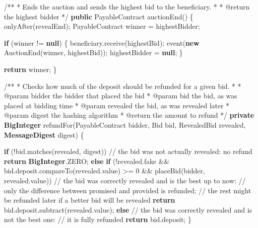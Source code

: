 \documentclass[a4paper,]{book}
\newenvironment{Shaded}{\begin{snugshade}}{\end{snugshade}}
\newcommand{\AnnotationTok}[1]{\textcolor[rgb]{0.79,0.38,0.79}{#1}}
\newcommand{\BuiltInTok}[1]{\textcolor[rgb]{0.39,0.29,0.61}{\textbf{#1}}}
\newcommand{\CommentTok}[1]{\textcolor[rgb]{0.54,0.53,0.53}{#1}}
\newcommand{\DecValTok}[1]{\textcolor[rgb]{0.69,0.50,0.00}{#1}}
\newcommand{\FunctionTok}[1]{\textcolor[rgb]{0.39,0.29,0.61}{#1}}
\newcommand{\KeywordTok}[1]{\textcolor[rgb]{0.12,0.11,0.11}{\textbf{#1}}}
\newcommand{\NormalTok}[1]{\textcolor[rgb]{0.12,0.11,0.11}{#1}}
\renewenvironment{Shaded}{\begin{snugshade}\small}{\end{snugshade}}
\begin{document}
{\begin{Shaded}
\begin{Highlighting}[]
  \CommentTok{/**}
   \CommentTok{*}\NormalTok{ Ends the auction and sends the highest bid to the beneficiary}\CommentTok{.}
   \CommentTok{*} 
   \CommentTok{*} \AnnotationTok{@return }\NormalTok{the highest bidder}
   \CommentTok{*/}
  \KeywordTok{public}\NormalTok{ PayableContract }\FunctionTok{auctionEnd}\NormalTok{() \{}
    \FunctionTok{onlyAfter}\NormalTok{(revealEnd);}
\NormalTok{    PayableContract winner = highestBidder;}
        
    \KeywordTok{if}\NormalTok{ (winner != }\KeywordTok{null}\NormalTok{) \{}
\NormalTok{      beneficiary.}\FunctionTok{receive}\NormalTok{(highestBid);}
      \FunctionTok{event}\NormalTok{(}\KeywordTok{new} \FunctionTok{AuctionEnd}\NormalTok{(winner, highestBid));}
\NormalTok{      highestBidder = }\KeywordTok{null}\NormalTok{;}
\NormalTok{    \}}

    \KeywordTok{return}\NormalTok{ winner;}
\NormalTok{  \}}

  \CommentTok{/**}
   \CommentTok{*}\NormalTok{ Checks how much of the deposit should be refunded for a given bid}\CommentTok{.}
   \CommentTok{*} 
   \CommentTok{*} \AnnotationTok{@param bidder }\NormalTok{the bidder that placed the bid}
   \CommentTok{*} \AnnotationTok{@param bid }\NormalTok{the bid}\CommentTok{,}\NormalTok{ as was placed at bidding time}
   \CommentTok{*} \AnnotationTok{@param revealed }\NormalTok{the bid}\CommentTok{,}\NormalTok{ as was revealed later}
   \CommentTok{*} \AnnotationTok{@param digest }\NormalTok{the hashing algorithm}
   \CommentTok{*} \AnnotationTok{@return }\NormalTok{the amount to refund}
   \CommentTok{*/}
  \KeywordTok{private} \BuiltInTok{BigInteger} \FunctionTok{refundFor}\NormalTok{(PayableContract bidder, Bid bid,}
\NormalTok{      RevealedBid revealed, }\BuiltInTok{MessageDigest}\NormalTok{ digest) \{}

    \KeywordTok{if}\NormalTok{ (!bid.}\FunctionTok{matches}\NormalTok{(revealed, digest))}
      \CommentTok{// the bid was not actually revealed: no refund}
      \KeywordTok{return} \BuiltInTok{BigInteger}\NormalTok{.}\FunctionTok{ZERO}\NormalTok{;}
    \KeywordTok{else} \KeywordTok{if}\NormalTok{ (!revealed.}\FunctionTok{fake}\NormalTok{ && bid.}\FunctionTok{deposit}\NormalTok{.}\FunctionTok{compareTo}\NormalTok{(revealed.}\FunctionTok{value}\NormalTok{) >= }\DecValTok{0}
\NormalTok{        && }\FunctionTok{placeBid}\NormalTok{(bidder, revealed.}\FunctionTok{value}\NormalTok{))}
      \CommentTok{// the bid was correctly revealed and is the best up to now:}
      \CommentTok{// only the difference between promised and provided is refunded;}
      \CommentTok{// the rest might be refunded later if a better bid will be revealed}
      \KeywordTok{return}\NormalTok{ bid.}\FunctionTok{deposit}\NormalTok{.}\FunctionTok{subtract}\NormalTok{(revealed.}\FunctionTok{value}\NormalTok{);}
    \KeywordTok{else}
      \CommentTok{// the bid was correctly revealed and is not the best one:}
      \CommentTok{// it is fully refunded}
      \KeywordTok{return}\NormalTok{ bid.}\FunctionTok{deposit}\NormalTok{;}
\NormalTok{  \}}


\end{Highlighting}
\end{Shaded}}
\end{document}
